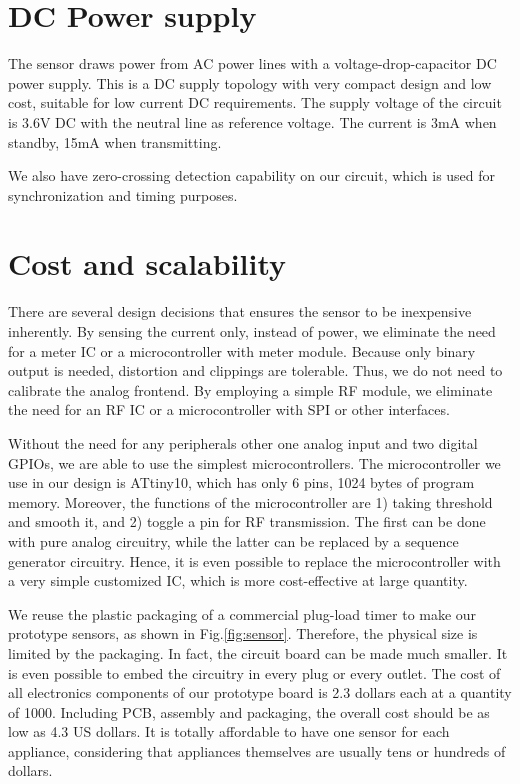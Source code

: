 \section{DC Power supply}

The sensor draws power from AC power lines with a voltage-drop-capacitor DC power supply. This is a DC supply topology with very compact design and low cost, suitable for low current DC requirements. The supply voltage of the circuit is 3.6V DC with the neutral line as reference voltage. The current is 3mA when standby, 15mA when transmitting. 

We also have zero-crossing detection capability on our circuit, which is used for synchronization and timing purposes. 

\section{Cost and scalability}

There are several design decisions that ensures the sensor to be inexpensive inherently. By sensing the current only, instead of power, we eliminate the need for a meter IC or a microcontroller with meter module. Because only binary output is needed, distortion and clippings are tolerable. Thus, we do not need to calibrate the analog frontend. By employing a simple RF module, we eliminate the need for an RF IC or a microcontroller with SPI or other interfaces. 

Without the need for any peripherals other one analog input and two digital GPIOs, we are able to use the simplest microcontrollers. The microcontroller we use in our design is ATtiny10, which has only 6 pins, 1024 bytes of program memory. Moreover, the functions of the microcontroller are 1) taking threshold and smooth it, and 2) toggle a pin for RF transmission. The first can be done with pure analog circuitry, while the latter can be replaced by a sequence generator circuitry. Hence, it is even possible to replace the microcontroller with a very simple customized IC, which is more cost-effective at large quantity. 

We reuse the plastic packaging of a commercial plug-load timer to make our prototype sensors, as shown in Fig.\ref{fig:sensor}. Therefore, the physical size is limited by the packaging. In fact, the circuit board can be made much smaller. It is even possible to embed the circuitry in every plug or every outlet. The cost of all electronics components of our prototype board is 2.3 dollars each at a quantity of 1000. Including PCB, assembly and packaging, the overall cost should be as low as 4.3 US dollars. It is totally affordable to have one sensor for each appliance, considering that appliances themselves are usually tens or hundreds of dollars. 

